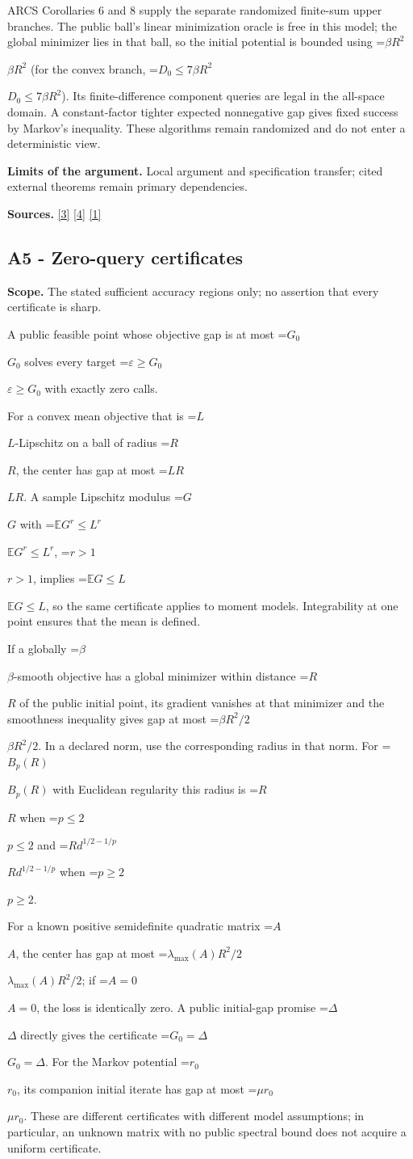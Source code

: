 \documentclass[10pt,a4paper]{article}
\newcommand{\AtlasMath}[1]{\par\begingroup\centering\setbox0=\hbox{$\displaystyle #1$}\ifdim\wd0>1.4\linewidth\typeout{ATLAS WIDE FORMULA: \the\wd0}\fi\ifdim\wd0>\linewidth\resizebox{\linewidth}{!}{\box0}\else\box0\fi\par\endgroup}
\newcommand{\AtlasInlineMath}[1]{\begingroup\setbox0=\hbox{$#1$}\ifdim\wd0>.4\linewidth\endgroup\AtlasMath{#1}\else\endgroup$#1$\fi}
\begin{document}
ARCS Corollaries 6 and 8 supply the separate randomized finite-sum upper branches. The public ball's linear minimization oracle is free in this model; the global minimizer lies in that ball, so the initial potential is bounded using \AtlasInlineMath{\beta R^2} (for the convex branch, \AtlasInlineMath{D_0\le7\beta R^2}). Its finite-difference component queries are legal in the all-space domain. A constant-factor tighter expected nonnegative gap gives fixed success by Markov's inequality. These algorithms remain randomized and do not enter a deterministic view.

\textbf{Limits of the argument.} Local argument and specification transfer; cited external theorems remain primary dependencies.

\textbf{Sources.} \href{https://arxiv.org/html/2610.00345v1}{[3]} \href{https://arxiv.org/abs/2109.08858}{[4]} \href{https://arxiv.org/html/2607.16558v2}{[1]}

\subsection{A5 - Zero-query certificates}
\textbf{Scope.} The stated sufficient accuracy regions only; no assertion that every certificate is sharp.

A public feasible point whose objective gap is at most \AtlasInlineMath{G_0} solves every target \AtlasInlineMath{\varepsilon\ge G_0} with exactly zero calls.

For a convex mean objective that is \AtlasInlineMath{L}-Lipschitz on a ball of radius \AtlasInlineMath{R}, the center has gap at most \AtlasInlineMath{LR}. A sample Lipschitz modulus \AtlasInlineMath{G} with \AtlasInlineMath{\mathbb E G^r\le L^r}, \AtlasInlineMath{r>1}, implies \AtlasInlineMath{\mathbb E G\le L}, so the same certificate applies to moment models. Integrability at one point ensures that the mean is defined.

If a globally \AtlasInlineMath{\beta}-smooth objective has a global minimizer within distance \AtlasInlineMath{R} of the public initial point, its gradient vanishes at that minimizer and the smoothness inequality gives gap at most \AtlasInlineMath{\beta R^2/2}. In a declared norm, use the corresponding radius in that norm. For \AtlasInlineMath{B_p(R)} with Euclidean regularity this radius is \AtlasInlineMath{R} when \AtlasInlineMath{p\le2} and \AtlasInlineMath{R d^{1/2-1/p}} when \AtlasInlineMath{p\ge2}.

For a known positive semidefinite quadratic matrix \AtlasInlineMath{A}, the center has gap at most \AtlasInlineMath{\lambda_{\max}(A)R^2/2}; if \AtlasInlineMath{A=0}, the loss is identically zero. A public initial-gap promise \AtlasInlineMath{\Delta} directly gives the certificate \AtlasInlineMath{G_0=\Delta}. For the Markov potential \AtlasInlineMath{r_0}, its companion initial iterate has gap at most \AtlasInlineMath{\mu r_0}. These are different certificates with different model assumptions; in particular, an unknown matrix with no public spectral bound does not acquire a uniform certificate.
\end{document}
